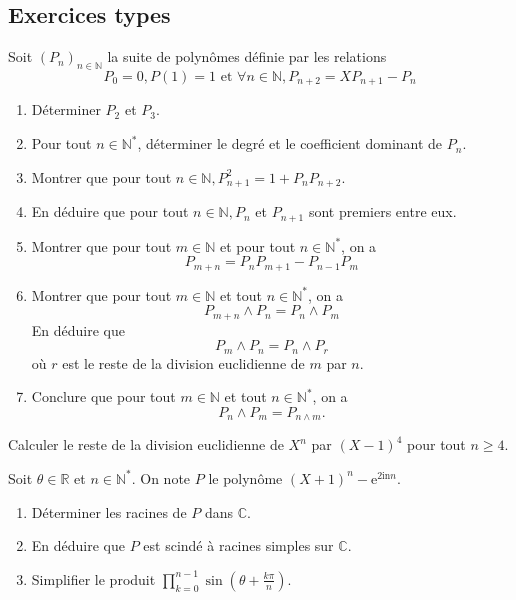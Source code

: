 \documentclass[titlepage, twoside]{report}
\begin{document}
\subsection{Exercices types}
\begin{tcolorbox}[title=Exercice 1, title filled=false, colframe=darkgreen, colback=darkgreen!10!white]
    Soit $\left(P_n\right)_{n \in \mathbb{N}}$ la suite de polynômes définie par les relations
    $$P_0=0, P(1)=1 \text { et } \forall n \in \mathbb{N}, P_{n+2}=X P_{n+1}-P_n$$
    \begin{enumerate}
        \item Déterminer $P_2$ et $P_3$.
        \item Pour tout $n \in \mathbb{N}^*$, déterminer le degré et le coefficient dominant de $P_n$.
        \item Montrer que pour tout $n \in \mathbb{N}, P_{n+1}^2=1+P_n P_{n+2}$.
        \item En déduire que pour tout $n \in \mathbb{N}, P_n$ et $P_{n+1}$ sont premiers entre eux.
        \item Montrer que pour tout $m \in \mathbb{N}$ et pour tout $n \in \mathbb{N}^*$, on a
        $$P_{m+n}=P_n P_{m+1}-P_{n-1} P_m$$
        \item Montrer que pour tout $m \in \mathbb{N}$ et tout $n \in \mathbb{N}^*$, on a
        $$P_{m+n} \wedge P_n=P_n \wedge P_m$$
        En déduire que
        $$P_m \wedge P_n=P_n \wedge P_r$$
        où $r$ est le reste de la division euclidienne de $m$ par $n$.
        \item Conclure que pour tout $m \in \mathbb{N}$ et tout $n \in \mathbb{N}^*$, on a
        $$P_n \wedge P_m=P_{n \wedge m}.$$
    \end{enumerate}
\end{tcolorbox}

\begin{tcolorbox}[title=Exercice 2, title filled=false, colframe=darkgreen, colback=darkgreen!10!white]
    Calculer le reste de la division euclidienne de $X^n$ par $(X-1)^4$ pour tout $n \geq 4$.
\end{tcolorbox}

\begin{tcolorbox}[title=Exemple 3, title filled=false, colframe=darkgreen, colback=darkgreen!10!white]
    Soit $\theta \in \mathbb{R}$ et $n \in \mathbb{N}^*$. On note $P$ le polynôme $(X+1)^n-\mathrm{e}^{2 \mathrm{in} n}$.
    \begin{enumerate}
        \item Déterminer les racines de $P$ dans $\mathbb{C}$.
        \item En déduire que $P$ est scindé à racines simples sur $\mathbb{C}$.
        \item Simplifier le produit $\prod\limits_{k=0}^{n-1} \sin \left(\theta+\frac{k \pi}{n}\right)$.
    \end{enumerate}
\end{tcolorbox}
\end{document}
